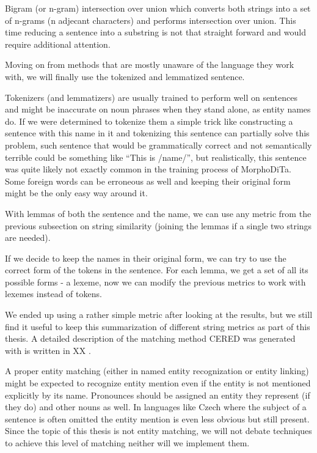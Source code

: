 Bigram (or n-gram) intersection over union which converts both strings into a set of n-grams (n adjecant characters) and performs intersection over union. This time reducing a sentence into a substring is not that straight forward and would require additional attention.









Moving on from methods that are mostly unaware of the language they work with, we will finally use the tokenized and lemmatized sentence.

Tokenizers (and lemmatizers) are usually trained to perform well on sentences and might be inaccurate on noun phrases when they stand alone, as entity names do. If we were determined to tokenize them a simple trick like constructing a sentence with this name in it and tokenizing this sentence can partially solve this problem, such sentence that would be grammatically correct and not semantically terrible could be something like “This is /name/”, but realistically, this sentence was quite likely not exactly common in the training process of MorphoDiTa. Some foreign words can be erroneous as well and keeping their original form might be the only easy way around it.

With lemmas of both the sentence and the name, we can use any metric from the previous subsection on string similarity (joining the lemmas if a single two strings are needed).

If we decide to keep the names in their original form, we can try to use the correct form of the tokens in the sentence. For each lemma, we get a set of all its possible forms - a lexeme, now we can modify the previous metrics to work with lexemes instead of tokens. 

We ended up using a rather simple metric after looking at the results, but we still find it useful to keep this summarization of different string metrics as part of this thesis. A detailed description of the matching method CERED was generated with is written in XX .


A proper entity matching (either in named entity recognization or entity linking) might be expected to recognize entity mention even if the entity is not mentioned explicitly by its name. Pronounces should be assigned an entity they represent (if they do) and other nouns as well. In languages like Czech where the subject of a sentence is often omitted the entity mention is even less obvious but still present. Since the topic of this thesis is not entity matching, we will not debate techniques to achieve this level of matching neither will we implement them.

